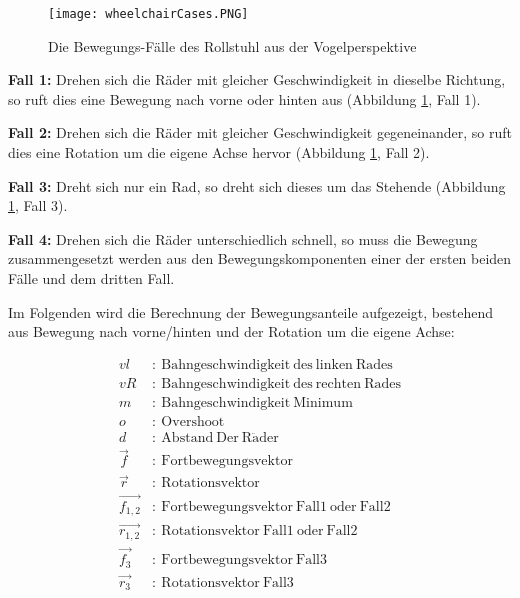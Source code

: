 \begin{figure}[h]
    \centering
    \texttt{[image: wheelchairCases.PNG]}
    \caption{Die Bewegungs-Fälle des Rollstuhl aus der Vogelperspektive}
    \label{fig:wheelchairCases}
\end{figure}

\textbf{Fall 1:} Drehen sich die Räder mit gleicher Geschwindigkeit in dieselbe Richtung, so ruft dies eine Bewegung nach vorne oder hinten aus (Abbildung \ref{fig:wheelchairCases}, Fall 1).

\textbf{Fall 2:} Drehen sich die Räder mit gleicher Geschwindigkeit gegeneinander, so ruft dies eine Rotation um die eigene Achse hervor (Abbildung \ref{fig:wheelchairCases}, Fall 2).

\textbf{Fall 3:} Dreht sich nur ein Rad, so dreht sich dieses um das Stehende (Abbildung \ref{fig:wheelchairCases}, Fall 3).

\textbf{Fall 4:} Drehen sich die Räder unterschiedlich schnell, so muss die Bewegung zusammengesetzt werden aus den Bewegungskomponenten einer der ersten beiden Fälle und dem dritten Fall.

Im Folgenden wird die Berechnung der Bewegungsanteile aufgezeigt, bestehend aus Bewegung nach vorne/hinten und der Rotation um die eigene Achse:

\begin{align}
    vl            & : \ \mathrm{Bahngeschwindigkeit\ des\ linken\ Rades}  \\
    vR            & : \ \mathrm{Bahngeschwindigkeit\ des\ rechten\ Rades} \\
    m             & : \ \mathrm{Bahngeschwindigkeit\ Minimum}             \\
    o             & : \ \mathrm{Overshoot}                                \\
    d             & : \ \mathrm{Abstand\ Der\ R\ddot{a}der}               \\
    \vec{f}       & : \ \mathrm{Fortbewegungsvektor}                      \\
    \vec{r}       & : \ \mathrm{Rotationsvektor}                          \\
    \vec{f_{1,2}} & : \ \mathrm{Fortbewegungsvektor\ Fall1\ oder\ Fall2}  \\
    \vec{r_{1,2}} & : \ \mathrm{Rotationsvektor\ Fall1\ oder\ Fall2}      \\
    \vec{f_{3}}   & : \ \mathrm{Fortbewegungsvektor\ Fall3}               \\
    \vec{r_{3}}   & : \ \mathrm{Rotationsvektor\ Fall3}
\end{align}

